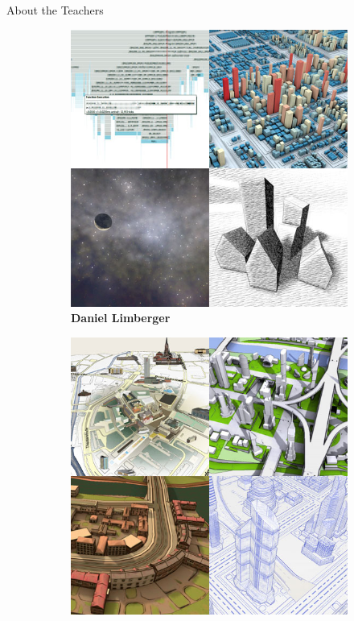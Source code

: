 \begin{frame}{About the Teachers}
\begin{figure}
\begin{subfigure}[b]{0.3\textwidth}
			\includegraphics[width=\textwidth]{intro/daniel}
			\caption{\normalsize \textbf{Daniel Limberger}}
		\end{subfigure}
		\quad
		\begin{subfigure}[b]{0.3\textwidth}
			\centering
			\includegraphics[width=\textwidth]{intro/amir}

\end{subfigure}
\end{figure}
\end{frame}
